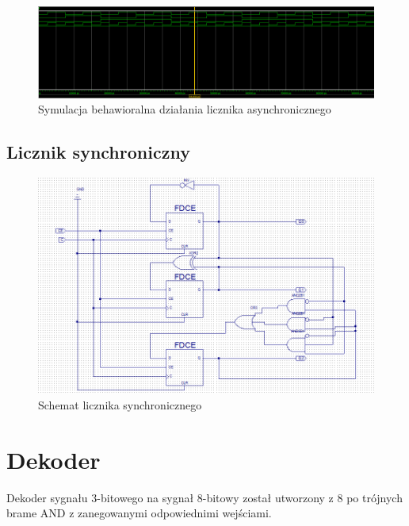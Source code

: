 \documentclass[wide,a4paper,titlepage,12pt] {article}
\begin{document}
  \begin{figure}[htbp]
    \begin{center}
      \includegraphics[scale=0.2]{licznik_beh.png}
      \caption{Symulacja behawioralna działania licznika asynchronicznego}
    \end{center}
  \end{figure}

  \newpage

  \subsection{Licznik synchroniczny}

  \begin{figure}[htbp]
    \begin{center}
      \includegraphics[scale=0.6]{licznik.png}
      \caption{Schemat licznika synchronicznego}
    \end{center}
  \end{figure}

  \newpage

  \section{Dekoder}
  Dekoder sygnału 3-bitowego na sygnał 8-bitowy został utworzony z 8 po trójnych brame AND z zanegowanymi odpowiednimi wejściami.
\end{document}
